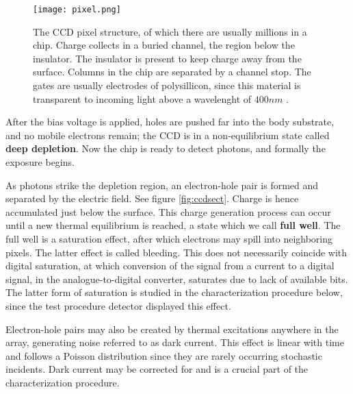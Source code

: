 \documentclass[../main.tex]{subfiles}
\begin{document}
	\begin{figure}[h!]
		\centering
		\texttt{[image: pixel.png]}
		\caption{The CCD pixel structure\cite{teledyneart}, of which there are usually millions in a chip\cite{teledyneart}. Charge collects in a buried channel, the region below the insulator. The insulator is present to keep charge away from the surface. Columns in the chip are separated by a channel stop\cite{teledyneart}. The gates are usually electrodes of polysillicon\cite{teledyneart}, since this material is transparent to incoming light above a wavelenght of $400nm$ \cite{teledyneart}. 
		}
		\label{fig:pixel}
	\end{figure}
	
	After the bias voltage is applied, holes are pushed far into the body substrate, and no mobile electrons remain; the CCD is in a non-equilibrium state called \textbf{deep depletion}. Now the chip is ready to detect photons, and formally the exposure begins. 
	
	As photons strike the depletion region, an electron-hole pair is formed and separated by the electric field. See figure \ref{fig:ccdsect}. Charge is hence accumulated just below the surface. This charge generation process can occur until a new thermal equilibrium is reached, a state which we call \textbf{full well}. The full well is a saturation effect, after which electrons may spill into neighboring pixels. The latter effect is called bleeding. This does not necessarily coincide with digital saturation, at which conversion of the signal from a current to a digital signal, in the analogue-to-digital converter, saturates due to lack of available bits. The latter form of saturation is studied in the characterization procedure below, since the test procedure detector displayed this effect.
	
	Electron-hole pairs may also be created by thermal excitations anywhere in the array, generating noise referred to as dark current. This effect is linear with time and follows a Poisson distribution since they are rarely occurring stochastic incidents. Dark current may be corrected for and is a crucial part of the characterization procedure.  
	
\end{document}
